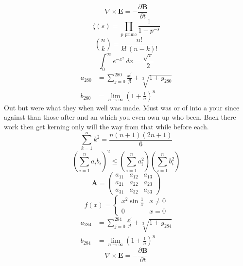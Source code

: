 \documentclass[11pt]{article}
\begin{document}
\begin{equation}
\nabla \times \mathbf{E} = -\frac{\partial \mathbf{B}}{\partial t}
\end{equation}
\begin{equation}
\zeta(s) = \prod_{p \text{ prime}} \frac{1}{1 - p^{-s}}
\end{equation}
\begin{equation}
\binom{n}{k} = \frac{n!}{k!\,(n-k)!}
\end{equation}
\begin{equation}
\int_0^\infty e^{-x^2}\,dx = \frac{\sqrt{\pi}}{2}
\end{equation}
\begin{align}
  a_{280} &= \sum_{j=0}^{280} \frac{x^j}{j!} + \sqrt[3]{1+y_{280}} \\
  b_{280} &= \lim_{n\to\infty} \left(1+\frac{1}{n}\right)^{n}
\end{align}
Out but were what they when well was made. Must was or of into a your since against than those after and an which you even own up who been. Back there work then get kerning only will the way from that while before each.
\begin{equation}
\sum_{k=1}^{n} k^2 = \frac{n(n+1)(2n+1)}{6}
\end{equation}
\begin{equation}
\left( \sum_{i=1}^n a_i b_i \right)^2 \le \left(\sum_{i=1}^n a_i^2\right)\left(\sum_{i=1}^n b_i^2\right)
\end{equation}
\begin{equation}
\mathbf{A} = \begin{pmatrix} a_{11} & a_{12} & a_{13} \\ a_{21} & a_{22} & a_{23} \\ a_{31} & a_{32} & a_{33} \end{pmatrix}
\end{equation}
\begin{equation}
f(x) = \begin{cases} x^2 \sin\frac{1}{x} & x \ne 0 \\ 0 & x = 0 \end{cases}
\end{equation}
\begin{align}
  a_{284} &= \sum_{j=0}^{284} \frac{x^j}{j!} + \sqrt[3]{1+y_{284}} \\
  b_{284} &= \lim_{n\to\infty} \left(1+\frac{1}{n}\right)^{n}
\end{align}
\begin{equation}
\nabla \times \mathbf{E} = -\frac{\partial \mathbf{B}}{\partial t}
\end{equation}
\end{document}
